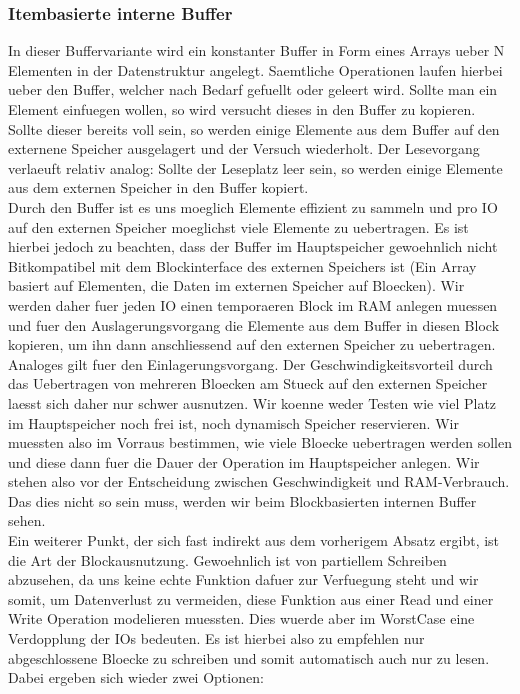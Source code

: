 \documentclass[10pt,a4paper]{article}
\begin{document}
\subsubsection{Itembasierte interne Buffer}
In dieser Buffervariante wird ein konstanter Buffer in Form eines Arrays ueber N Elementen in der Datenstruktur angelegt. Saemtliche Operationen laufen hierbei ueber den Buffer, welcher nach Bedarf gefuellt oder geleert wird. Sollte man ein Element einfuegen wollen, so wird versucht dieses in den Buffer zu kopieren. Sollte dieser bereits voll sein, so werden einige Elemente aus dem Buffer auf den externene Speicher ausgelagert und der Versuch wiederholt. Der Lesevorgang verlaeuft relativ analog: Sollte der Leseplatz leer sein, so werden einige Elemente aus dem externen Speicher in den Buffer kopiert.\\
Durch den Buffer ist es uns moeglich Elemente effizient zu sammeln und pro IO auf den externen Speicher moeglichst viele Elemente zu uebertragen. Es ist hierbei jedoch zu beachten, dass der Buffer im Hauptspeicher gewoehnlich nicht Bitkompatibel mit dem Blockinterface des externen Speichers ist (Ein Array basiert auf Elementen, die Daten im externen Speicher auf Bloecken). Wir werden daher fuer jeden IO einen temporaeren Block im RAM anlegen muessen und fuer den Auslagerungsvorgang die Elemente aus dem Buffer in diesen Block kopieren, um ihn dann anschliessend auf den externen Speicher zu uebertragen. Analoges gilt fuer den Einlagerungsvorgang. Der Geschwindigkeitsvorteil durch das Uebertragen von mehreren Bloecken am Stueck auf den externen Speicher laesst sich daher nur schwer ausnutzen. Wir koenne weder Testen wie viel Platz im Hauptspeicher noch frei ist, noch dynamisch Speicher reservieren. Wir muessten also im Vorraus bestimmen, wie viele Bloecke uebertragen werden sollen und diese dann fuer die Dauer der Operation im Hauptspeicher anlegen. Wir stehen also vor der Entscheidung zwischen Geschwindigkeit und RAM-Verbrauch. Das dies nicht so sein muss, werden wir beim Blockbasierten internen Buffer sehen.\\
Ein weiterer Punkt, der sich fast indirekt aus dem vorherigem Absatz ergibt, ist die Art der Blockausnutzung. Gewoehnlich ist von partiellem Schreiben abzusehen, da uns keine echte Funktion dafuer zur Verfuegung steht und wir somit, um Datenverlust zu vermeiden, diese Funktion aus einer Read und einer Write Operation modelieren muessten. Dies wuerde aber im WorstCase eine Verdopplung der IOs bedeuten. Es ist hierbei also zu empfehlen nur abgeschlossene Bloecke zu schreiben und somit automatisch auch nur zu lesen. Dabei ergeben sich wieder zwei Optionen: 
\end{document}
